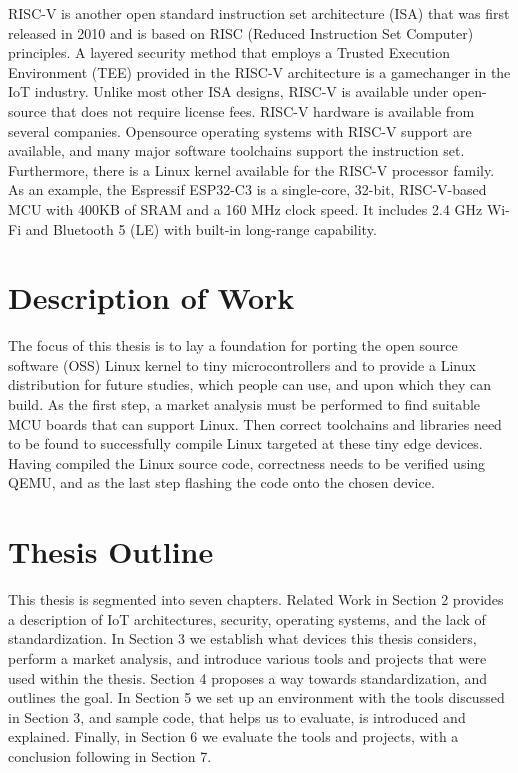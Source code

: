 RISC-V is another open standard instruction set architecture (ISA) that was first released in 2010 and is based on RISC (Reduced Instruction Set Computer) principles. A layered security method that employs a Trusted Execution Environment (TEE) provided in the RISC-V architecture is a gamechanger in the IoT industry. Unlike most other ISA designs, RISC-V is available under open-source that does not require license fees. RISC-V hardware is available from several companies. Opensource operating systems with RISC-V support are available, and many major software toolchains support the instruction set. Furthermore, there is a Linux kernel available for the RISC-V processor family. As an example, the Espressif ESP32-C3 is a single-core, 32-bit, RISC-V-based MCU with 400KB of SRAM and a 160 MHz clock speed. It includes 2.4 GHz Wi-Fi and Bluetooth 5 (LE) with built-in long-range capability.


\section{Description of Work}

The focus of this thesis is to lay a foundation for porting the open source software (OSS) Linux kernel to tiny microcontrollers and to provide a Linux distribution for future studies, which people can use, and upon which they can build. As the first step, a market analysis must be performed to find suitable MCU boards that can support Linux. Then correct toolchains and libraries need to be found to successfully compile Linux targeted at these tiny edge devices. Having compiled the Linux source code, correctness needs to be verified using QEMU, and as the last step flashing the code onto the chosen device.

\section{Thesis Outline}
This thesis is segmented into seven chapters. Related Work in Section 2 provides a description of IoT architectures, security, operating systems, and the lack of standardization. In Section 3 we establish what devices this thesis considers, perform a market analysis, and introduce various tools and projects that were used within the thesis. Section 4 proposes a way towards standardization, and outlines the goal. In Section 5 we set up an environment with the tools discussed in Section 3, and sample code, that helps us to evaluate, is introduced and explained. Finally, in Section 6 we evaluate the tools and projects, with a conclusion following in Section 7.

